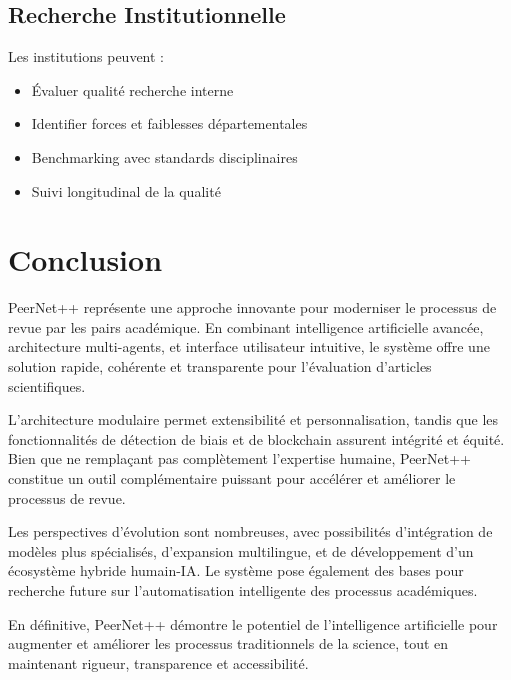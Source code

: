 \documentclass[12pt,a4paper]{article}
\begin{document}
\subsection{Recherche Institutionnelle}

Les institutions peuvent :
\begin{itemize}
    \item Évaluer qualité recherche interne
    \item Identifier forces et faiblesses départementales
    \item Benchmarking avec standards disciplinaires
    \item Suivi longitudinal de la qualité
\end{itemize}

\section{Conclusion}

PeerNet++ représente une approche innovante pour moderniser le processus de revue par les pairs académique. En combinant intelligence artificielle avancée, architecture multi-agents, et interface utilisateur intuitive, le système offre une solution rapide, cohérente et transparente pour l'évaluation d'articles scientifiques.

L'architecture modulaire permet extensibilité et personnalisation, tandis que les fonctionnalités de détection de biais et de blockchain assurent intégrité et équité. Bien que ne remplaçant pas complètement l'expertise humaine, PeerNet++ constitue un outil complémentaire puissant pour accélérer et améliorer le processus de revue.

Les perspectives d'évolution sont nombreuses, avec possibilités d'intégration de modèles plus spécialisés, d'expansion multilingue, et de développement d'un écosystème hybride humain-IA. Le système pose également des bases pour recherche future sur l'automatisation intelligente des processus académiques.

En définitive, PeerNet++ démontre le potentiel de l'intelligence artificielle pour augmenter et améliorer les processus traditionnels de la science, tout en maintenant rigueur, transparence et accessibilité.
\end{document}
